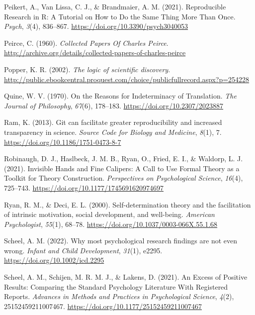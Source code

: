 \documentclass[
  man, noextraspace,floatsintext]{apa7}
\newlength{\cslhangindent}
\newenvironment{CSLReferences}[2] %
 {\begin{list}{}{%
  \setlength{\itemindent}{0pt}
  \setlength{\leftmargin}{0pt}
  \setlength{\parsep}{0pt}
  \ifodd #1
   \setlength{\leftmargin}{\cslhangindent}
   \setlength{\itemindent}{-1\cslhangindent}
  \fi
  \setlength{\itemsep}{#2\baselineskip}}}
 {\end{list}}
\begin{document}
\begin{CSLReferences}{1}{0}
Peikert, A., Van Lissa, C. J., \& Brandmaier, A. M. (2021). Reproducible {Research} in {R}: {A Tutorial} on {How} to {Do} the {Same Thing More Than Once}. \emph{Psych}, \emph{3}(4), 836--867. \url{https://doi.org/10.3390/psych3040053}

Peirce, C. (1960). \emph{Collected {Papers Of Charles Peirce}}. \url{http://archive.org/details/collected-papers-of-charles-peirce}

Popper, K. R. (2002). \emph{The logic of scientific discovery}. \url{http://public.ebookcentral.proquest.com/choice/publicfullrecord.aspx?p=254228}

Quine, W. V. (1970). On the {Reasons} for {Indeterminacy} of {Translation}. \emph{The Journal of Philosophy}, \emph{67}(6), 178--183. \url{https://doi.org/10.2307/2023887}

Ram, K. (2013). Git can facilitate greater reproducibility and increased transparency in science. \emph{Source Code for Biology and Medicine}, \emph{8}(1), 7. \url{https://doi.org/10.1186/1751-0473-8-7}

Robinaugh, D. J., Haslbeck, J. M. B., Ryan, O., Fried, E. I., \& Waldorp, L. J. (2021). Invisible {Hands} and {Fine Calipers}: {A Call} to {Use Formal Theory} as a {Toolkit} for {Theory Construction}. \emph{Perspectives on Psychological Science}, \emph{16}(4), 725--743. \url{https://doi.org/10.1177/1745691620974697}

Ryan, R. M., \& Deci, E. L. (2000). Self-determination theory and the facilitation of intrinsic motivation, social development, and well-being. \emph{American Psychologist}, \emph{55}(1), 68--78. \url{https://doi.org/10.1037/0003-066X.55.1.68}

Scheel, A. M. (2022). Why most psychological research findings are not even wrong. \emph{Infant and Child Development}, \emph{31}(1), e2295. \url{https://doi.org/10.1002/icd.2295}

Scheel, A. M., Schijen, M. R. M. J., \& Lakens, D. (2021). An {Excess} of {Positive Results}: {Comparing} the {Standard Psychology Literature With Registered Reports}. \emph{Advances in Methods and Practices in Psychological Science}, \emph{4}(2), 25152459211007467. \url{https://doi.org/10.1177/25152459211007467}


\end{CSLReferences}
\end{document}
